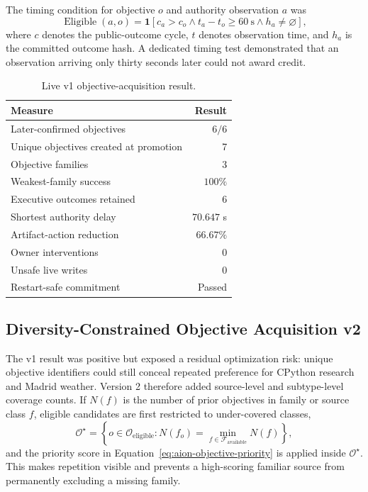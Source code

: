 The timing condition for objective $o$ and authority observation $a$ was
\begin{equation}
\operatorname{Eligible}(a,o)=
\mathbf{1}\!\left[
  c_a>c_o
  \land t_a-t_o\geq 60\ \mathrm{s}
  \land h_a\neq\varnothing
\right],
\label{eq:aion-delayed-authority-eligibility}
\end{equation}
where $c$ denotes the public-outcome cycle, $t$ denotes observation time, and
$h_a$ is the committed outcome hash.  A dedicated timing test demonstrated
that an observation arriving only thirty seconds later could not award credit.

\begin{table}[htbp]
\centering
\caption{Live v1 objective-acquisition result.}
\label{tab:aion-varied-objective-v1}
\begin{tabularx}{\textwidth}{@{}>{\raggedright\arraybackslash}Xr@{}}
\toprule
Measure & Result \\
\midrule
Later-confirmed objectives & $6/6$ \\
Unique objectives created at promotion & 7 \\
Objective families & 3 \\
Weakest-family success & $100\%$ \\
Executive outcomes retained & 6 \\
Shortest authority delay & $70.647$ s \\
Artifact-action reduction & $66.67\%$ \\
Owner interventions & 0 \\
Unsafe live writes & 0 \\
Restart-safe commitment & Passed \\
\bottomrule
\end{tabularx}
\end{table}

\subsection{Diversity-Constrained Objective Acquisition v2}
\label{subsec:aion-diversity-objective-v2}

The v1 result was positive but exposed a residual optimization risk: unique
objective identifiers could still conceal repeated preference for CPython
research and Madrid weather.  Version 2 therefore added source-level and
subtype-level coverage counts.  If $N(f)$ is the number of prior objectives in
family or source class $f$, eligible candidates are first restricted to
under-covered classes,
\begin{equation}
\mathcal{O}^{\star}=
\left\{o\in\mathcal{O}_{\mathrm{eligible}}:
N(f_o)=\min_{f\in\mathcal{F}_{\mathrm{available}}}N(f)
\right\},
\label{eq:aion-diversity-filter}
\end{equation}
and the priority score in Equation~\eqref{eq:aion-objective-priority} is applied
inside $\mathcal{O}^{\star}$.  This makes repetition visible and prevents a
high-scoring familiar source from permanently excluding a missing family.

